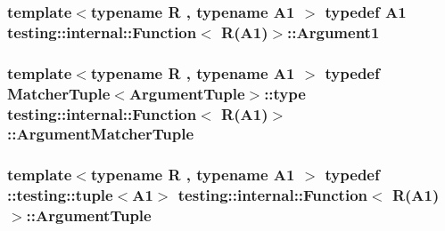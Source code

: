 \subsubsection[{\texorpdfstring{Argument1}{Argument1}}]{\setlength{\rightskip}{0pt plus 5cm}template$<$typename R , typename A1 $>$ typedef A1 {\bf testing\+::internal\+::\+Function}$<$ R(A1)$>$\+::{\bf Argument1}}\hypertarget{structtesting_1_1internal_1_1Function_3_01R_07A1_08_4_aca36c8586218fd015cc4736dc8d4c14f}{}\label{structtesting_1_1internal_1_1Function_3_01R_07A1_08_4_aca36c8586218fd015cc4736dc8d4c14f}
\subsubsection[{\texorpdfstring{Argument\+Matcher\+Tuple}{ArgumentMatcherTuple}}]{\setlength{\rightskip}{0pt plus 5cm}template$<$typename R , typename A1 $>$ typedef {\bf Matcher\+Tuple}$<${\bf Argument\+Tuple}$>$\+::type {\bf testing\+::internal\+::\+Function}$<$ R(A1)$>$\+::{\bf Argument\+Matcher\+Tuple}}\hypertarget{structtesting_1_1internal_1_1Function_3_01R_07A1_08_4_a0e35671ae43c3d3310893e1d6d895d06}{}\label{structtesting_1_1internal_1_1Function_3_01R_07A1_08_4_a0e35671ae43c3d3310893e1d6d895d06}
\subsubsection[{\texorpdfstring{Argument\+Tuple}{ArgumentTuple}}]{\setlength{\rightskip}{0pt plus 5cm}template$<$typename R , typename A1 $>$ typedef \+::testing\+::tuple$<$A1$>$ {\bf testing\+::internal\+::\+Function}$<$ R(A1)$>$\+::{\bf Argument\+Tuple}}\hypertarget{structtesting_1_1internal_1_1Function_3_01R_07A1_08_4_afd48881a58d72658e547a170fb0f2087}{}\label{structtesting_1_1internal_1_1Function_3_01R_07A1_08_4_afd48881a58d72658e547a170fb0f2087}
